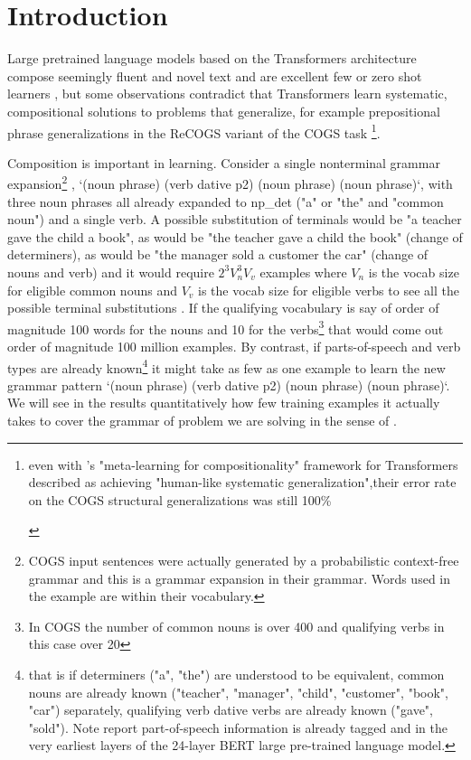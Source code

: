 \documentclass[11pt]{article}
\begin{document}
\section{Introduction}
Large pretrained language models based on the Transformers architecture compose seemingly fluent and novel text and are excellent few or zero shot learners \cite{Brown2020}, but some observations contradict that Transformers learn systematic, compositional solutions to problems that generalize, for example prepositional phrase generalizations in the ReCOGS \cite{Wu2023} variant of the COGS task \cite{KimLinzen2020}\footnote{
\begin{tiny}
even with \cite{lake2023human}'s "meta-learning for compositionality" framework for Transformers described as achieving "human-like systematic generalization",their error rate on the COGS structural generalizations was still 100\%
\end{tiny}
}.

Composition is important in learning. Consider a single nonterminal grammar expansion\footnote{COGS input sentences were actually generated by a probabilistic context-free grammar and this is a grammar expansion in their grammar. Words used in the example are within their vocabulary.} , `(noun phrase) (verb dative p2) (noun phrase) (noun phrase)`, with three noun phrases all already expanded to np\_det ("a" or "the" and "common noun") and a single verb. A possible substitution of terminals would be "a teacher gave the child a book", as would be "the teacher gave a child the book" (change of determiners), as would be "the manager sold a customer the car" (change of nouns and verb) and it would require $2^3 V_n^3V_v $ examples where $V_n$ is the vocab size for eligible common nouns and $V_v$ is the vocab size for eligible verbs to see all the possible terminal substitutions . If the qualifying vocabulary is say of order of magnitude 100 words for the nouns and 10 for the verbs\footnote{In COGS the number of common nouns is over 400 and qualifying verbs in this case over 20} that would come out order of magnitude 100 million examples. By contrast, if parts-of-speech and verb types are already known\footnote{that is if determiners ("a", "the") are understood to be equivalent, common nouns are already known ("teacher", "manager", "child", "customer", "book", "car") separately, qualifying verb dative verbs are already known ("gave", "sold"). Note \cite{tenney2019bertrediscoversclassicalnlp} report part-of-speech information is already tagged and in the very earliest layers of the 24-layer BERT large pre-trained language model.} it might take as few as one example to learn the new grammar pattern `(noun phrase) (verb dative p2) (noun phrase) (noun phrase)`.
We will see in the results quantitatively how few training examples it actually takes to cover the grammar of problem we are solving in the sense of \cite{fuzzingbook2023:GrammarCoverageFuzzer}.
\end{document}
